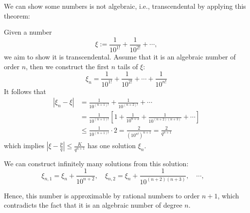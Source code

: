 We can show some numbers is not algebraic, i.e., transcendental by applying this theorem: 
\begin{example}
Given a number
\[
\xi:=\frac{1}{10^{1!}}+\frac{1}{10^{2!}}+\cdots,
\]
we aim to show it is transcendental. Assume that it is an algebraic number of order $n$, then we construct the first $n$ tails of $\xi$:
\[
\xi_n=\frac{1}{10^{1!}}+\frac{1}{10^{2!}}+\cdots+\frac{1}{10^{n!}}
\]
It follows that
\begin{align*}
|\xi_n-\xi|&=\frac{1}{10^{(n+1)!}}+\frac{1}{10^{(n+2)!}}+\cdots\\
&=\frac{1}{10^{(n+1)!}}\left[1+\frac{1}{10^{n+2}}+\frac{1}{10^{(n+2)(n+3)}}+\cdots\right]\\
&\le\frac{1}{10^{(n+1)!}}\cdot 2 = \frac{2}{(10^{n!})^{n+1}}=\frac{2}{q^{n+1}}
\end{align*}
which implies $|\xi-\frac{p}{q}|\le\frac{K}{q^{n+1}}$ has one solution $\xi_n$. 

We can construct infinitely many solutions from this solution:
\[
\xi_{n,1} = \xi_n+\frac{1}{10^{n+2}},\quad
\xi_{n,2} = \xi_n+\frac{1}{10^{(n+2)(n+3)}},\quad
\cdots,\quad
\]

Hence, this number is approximable by rational numbers to order $n+1$, which contradicts the fact that it is an algebraic number of degree $n$.
\end{example}

